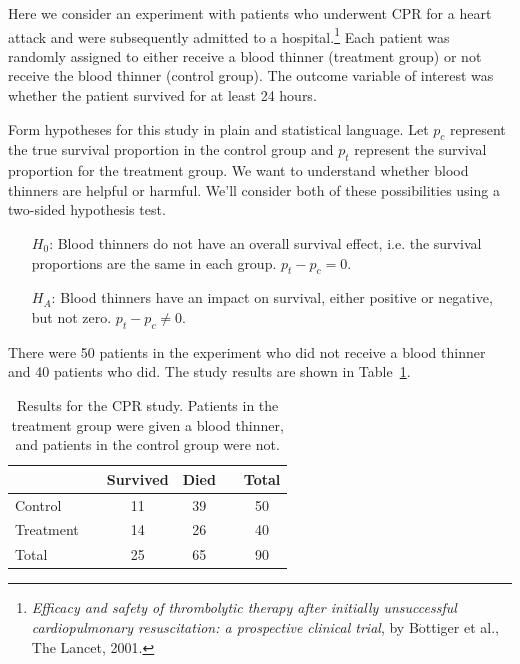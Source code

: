 Here we consider an experiment with patients who underwent CPR for a heart attack and were subsequently admitted to a hospital.\footnote{\emph{Efficacy and safety of thrombolytic therapy after initially unsuccessful cardiopulmonary resuscitation: a prospective clinical trial}, by B$\ddot{\text{o}}$ttiger et al., The Lancet, 2001.} Each patient was randomly assigned to either receive a blood thinner (treatment group) or not receive the blood thinner (control group). The outcome variable of interest was whether the patient survived for at least 24 hours.

\begin{example}{Form hypotheses for this study in plain and statistical language. Let $p_c$ represent the true survival proportion in the control group and $p_t$ represent the survival proportion for the treatment group.} \label{hypothesesForCPRStudyInSmallSampleSection}
We want to understand whether blood thinners are helpful or harmful. We'll consider both of these possibilities using a two-sided hypothesis test.
\begin{itemize}
\item[$H_0$:] Blood thinners do not have an overall survival effect, i.e. the survival proportions are the same in each group. $p_t - p_c = 0$.
\item[$H_A$:] Blood thinners have an impact on survival, either positive or negative, but not zero. $p_t - p_c \neq 0$.
\end{itemize}
\end{example}

There were 50 patients in the experiment who did not receive a blood thinner and 40 patients who did. The study results are shown in Table~\ref{resultsForCPRStudyInSmallSampleSection}.

\begin{table}[ht]
\centering
\begin{tabular}{lccccc}
\hline
			&& Survived 	& Died 	&& Total \\
\hline
Control		&& 11		& 39		&& 50 \\
Treatment		&& 14		& 26		&& 40 \\
\hline
Total			&& 25		& 65		&& 90 \\
\hline
\end{tabular}
\caption{Results for the CPR study. Patients in the treatment group were given a blood thinner, and patients in the control group were not.}
\label{resultsForCPRStudyInSmallSampleSection}
\end{table}

